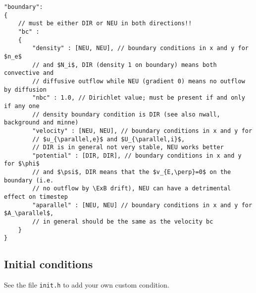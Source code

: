 \begin{verbatim}
"boundary":
{
    // must be either DIR or NEU in both directions!!
    "bc" :
    {
        "density" : [NEU, NEU], // boundary conditions in x and y for $n_e$
        // and $N_i$, DIR (density 1 on boundary) means both convective and
        // diffusive outflow while NEU (gradient 0) means no outflow by diffusion
        "nbc" : 1.0, // Dirichlet value; must be present if and only if any one
        // density boundary condition is DIR (see also nwall, background and minne)
        "velocity" : [NEU, NEU], // boundary conditions in x and y for
        // $u_{\parallel,e}$ and $U_{\parallel,i}$,
        // DIR is in general not very stable, NEU works better
        "potential" : [DIR, DIR], // boundary conditions in x and y for $\phi$
        // and $\psi$, DIR means that the $v_{E,\perp}=0$ on the boundary (i.e.
        // no outflow by \ExB drift), NEU can have a detrimental effect on timestep
        "aparallel" : [NEU, NEU] // boundary conditions in x and y for $A_\parallel$,
        // in general should be the same as the velocity bc
    }
}
\end{verbatim}

\subsection{Initial conditions} \label{sec:initial}
See the file {\tt init.h} to add your own custom condition.

